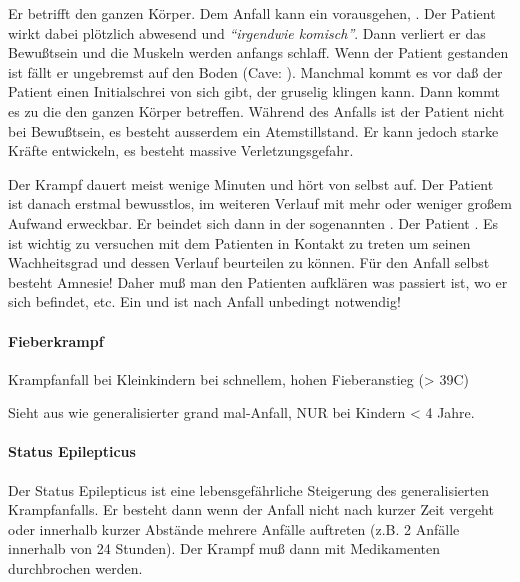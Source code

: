 Er betrifft den ganzen Körper. Dem Anfall kann ein
vorausgehen, . Der Patient wirkt
dabei plötzlich abwesend und \emph{"`irgendwie komisch"'}.
Dann verliert er das Bewußtsein und die Muskeln werden
anfangs schlaff. Wenn der Patient gestanden ist fällt er
ungebremst auf den Boden (Cave: ).
Manchmal kommt es vor daß der Patient einen
Initialschrei von sich gibt, der
gruselig klingen kann. Dann kommt es zu
die den ganzen Körper betreffen. Während des Anfalls ist der
Patient nicht bei Bewußtsein, es besteht ausserdem ein
Atemstillstand. Er kann jedoch starke Kräfte entwickeln, es
besteht massive
Verletzungsgefahr.

Der Krampf dauert meist wenige Minuten und hört von selbst
auf. Der Patient ist danach erstmal bewusstlos, im weiteren
Verlauf mit mehr oder weniger großem Aufwand erweckbar. Er
beindet sich dann in der sogenannten
.
Der Patient . Es ist
wichtig zu versuchen mit dem Patienten in Kontakt zu treten
um seinen Wachheitsgrad und dessen
Verlauf beurteilen zu können. Für den Anfall selbst besteht
Amnesie! Daher muß man den Patienten aufklären was passiert
ist, wo er sich befindet, etc. Ein  und
 ist nach \underline{} Anfall
unbedingt notwendig!


\paragraph{Fieberkrampf}\label{topic:fieberkrampf}

Krampfanfall bei Kleinkindern bei schnellem, hohen Fieberanstieg
({\textgreater} 39{\textdegree}C)

Sieht aus wie generalisierter grand mal-Anfall, NUR bei
Kindern {\textless} 4 Jahre.

\paragraph{Status Epilepticus} Der Status Epilepticus ist eine
lebensgefährliche Steigerung des
generalisierten Krampfanfalls. Er besteht dann wenn der Anfall nicht nach kurzer Zeit vergeht oder innerhalb kurzer Abstände
mehrere Anfälle auftreten (z.B. 2 Anfälle innerhalb von 24 Stunden). Der Krampf
muß dann mit Medikamenten durchbrochen werden. 

